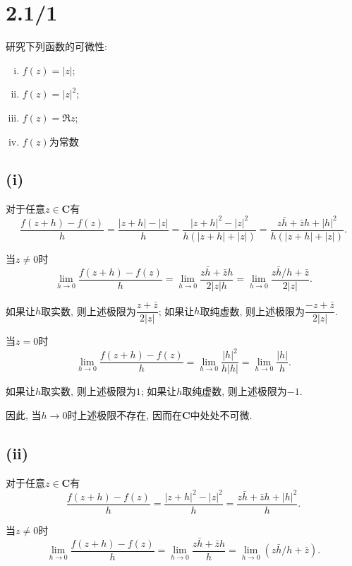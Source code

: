 \documentclass[11pt,a4paper]{article}
\author{刘逸灏 (515370910207)}
\begin{document}
\maketitle

\section{2.1/1}
\begin{problem}
研究下列函数的可微性:
\begin{enumerate}[(i)]
  \item $f(z)=|z|$;
  \item $f(z)=|z|^2$;
  \item $f(z)=\Re z$;
  \addtocounter{enumi}{1}
  \item $f(z)\text{为常数}$
\end{enumerate}
\end{problem}

\subsection*{(i)}

对于任意$z\in\mathbf{C}$有
$$\frac{f(z+h)-f(z)}{h}=\frac{|z+h|-|z|}{h}=\frac{|z+h|^2-|z|^2}{h(|z+h|+|z|)}=\frac{z\bar{h}+\bar{z}h+|h|^2}{h(|z+h|+|z|)}.$$

当$z\neq0$时
$$\lim_{h\to0}\frac{f(z+h)-f(z)}{h}=\lim_{h\to0}\frac{z\bar{h}+\bar{z}h}{2|z|h}=\lim_{h\to0}\frac{z\bar{h}/h+\bar{z}}{2|z|}.$$

如果让$h$取实数, 则上述极限为$\dfrac{z+\bar{z}}{2|z|}$; 如果让$h$取纯虚数, 则上述极限为$\dfrac{-z+\bar{z}}{2|z|}$.

当$z=0$时
$$\lim_{h\to0}\frac{f(z+h)-f(z)}{h}=\lim_{h\to0}\frac{|h|^2}{h|h|}=\lim_{h\to0}\frac{|h|}{h}.$$

如果让$h$取实数, 则上述极限为$1$; 如果让$h$取纯虚数, 则上述极限为$-1$.

因此, 当$h\to0$时上述极限不存在, 因而在$\mathbf{C}$中处处不可微.

\subsection*{(ii)}

对于任意$z\in\mathbf{C}$有
$$\frac{f(z+h)-f(z)}{h}=\frac{|z+h|^2-|z|^2}{h}=\frac{z\bar{h}+\bar{z}h+|h|^2}{h}.$$

当$z\neq0$时
$$\lim_{h\to0}\frac{f(z+h)-f(z)}{h}=\lim_{h\to0}\frac{z\bar{h}+\bar{z}h}{h}=\lim_{h\to0}(z\bar{h}/h+\bar{z}).$$
\end{document}
